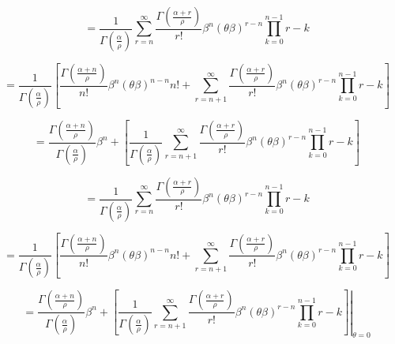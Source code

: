 \begin{frame}
    \begin{equation*}
        = \frac{1}{{\Gamma \left ( \frac{\alpha}{\rho} \right)}} \sum_{r=n}^{\infty} \frac{\Gamma \left (\frac{\alpha+r}{\rho} \right)}{r!}
          \beta^{n} (\theta \beta)^{r-n} \prod_{k=0}^{n-1} r-k
    \end{equation*}

    \begin{equation*}
        = \frac{1}{{\Gamma \left ( \frac{\alpha}{\rho} \right)}} \left
          [ \frac{\Gamma \left (\frac{\alpha+n}{\rho} \right)}{n!} \beta^n (\theta \beta)^{n-n} n! +
            \sum_{r=n+1}^{\infty} \frac{\Gamma \left (\frac{\alpha+r}{\rho} \right)}{r!} \beta^{n} (\theta \beta)^{r-n} \prod_{k=0}^{n-1} r-k \right ]
    \end{equation*}

    \begin{equation*}
        = \frac{\Gamma \left (\frac{\alpha+n}{\rho} \right)}{{\Gamma \left ( \frac{\alpha}{\rho} \right)}} \beta^n +
        \left[
            \frac{1}{{\Gamma \left ( \frac{\alpha}{\rho} \right)}}
            \sum_{r=n+1}^{\infty} \frac{\Gamma \left (\frac{\alpha+r}{\rho} \right)}{r!} \beta^{n} (\theta \beta)^{r-n} \prod_{k=0}^{n-1} r-k
        \right ]
    \end{equation*}
\end{frame}

\begin{frame}
    \begin{equation*}
        = \frac{1}{{\Gamma \left ( \frac{\alpha}{\rho} \right)}} \sum_{r=n}^{\infty} \frac{\Gamma \left (\frac{\alpha+r}{\rho} \right)}{r!}
          \beta^{n} (\theta \beta)^{r-n} \prod_{k=0}^{n-1} r-k
    \end{equation*}

    \begin{equation*}
        = \frac{1}{{\Gamma \left ( \frac{\alpha}{\rho} \right)}} \left
          [ \frac{\Gamma \left (\frac{\alpha+n}{\rho} \right)}{n!} \beta^n (\theta \beta)^{n-n} n! +
            \sum_{r=n+1}^{\infty} \frac{\Gamma \left (\frac{\alpha+r}{\rho} \right)}{r!} \beta^{n} (\theta \beta)^{r-n} \prod_{k=0}^{n-1} r-k \right ]
    \end{equation*}

    \begin{equation*}
        = \frac{\Gamma \left (\frac{\alpha+n}{\rho} \right)}{{\Gamma \left ( \frac{\alpha}{\rho} \right)}} \beta^n +
        \left.\left[ \frac{1}{{\Gamma \left ( \frac{\alpha}{\rho} \right)}}
            \sum_{r=n+1}^{\infty} \frac{\Gamma \left (\frac{\alpha+r}{\rho} \right)}{r!} \beta^{n} (\theta \beta)^{r-n} \prod_{k=0}^{n-1} r-k
        \right ] \right \vert_{\theta = 0}
    \end{equation*}
\end{frame}

